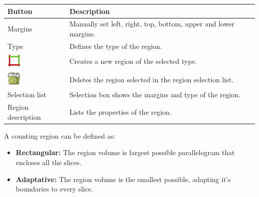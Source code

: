 \begin{tabular}{| m{1.3cm} | m{12cm} |}
\hline
\textbf{Button} & \textbf{Description}\\
\hline
Margins & Manually set left, right, top, bottom, upper and lower margins.\\
\hline
Type & Defines the type of the region.\\
\hline
\includegraphics[width=0.7cm]{../../plugins/CountingRegion/rsc/apply} & Creates a new region of the selected type.\\
\hline
\includegraphics[width=0.7cm]{../../plugins/CountingRegion/rsc/trash-full} & Deletes the region selected in the region selection list.\\
\hline
Selection list & Selection box shows the margins and type of the region.\\
\hline
Region description & Lists the properties of the region.\\
\hline
\end{tabular}
\vspace{0.3cm} 

A counting region can be defined as:
\begin{itemize}
\item \textbf{Rectangular:} The region volume is largest possible parallelogram that encloses all the slices.
\item \textbf{Adaptative:} The region volume is the smallest possible, adapting it's boundaries to every slice.
\end{itemize}

